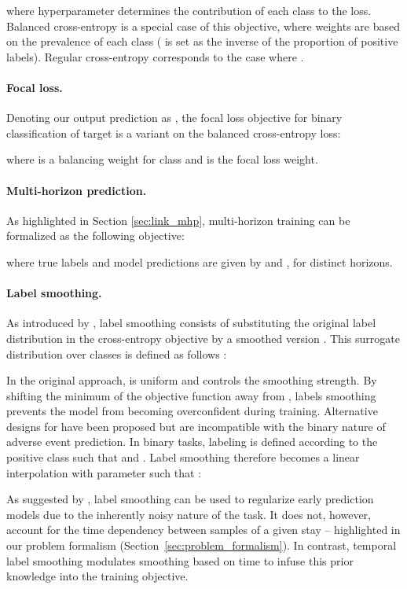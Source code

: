 \documentclass[nohyperref]{article}
\begin{document}
where hyperparameter  determines the contribution of each class to the loss. Balanced cross-entropy is a special case of this objective, where weights are based on the prevalence of each class ( is set as the inverse of the proportion of positive labels). Regular cross-entropy corresponds to the case where .


\paragraph{Focal loss.} Denoting our output prediction as , the focal loss objective for binary classification of target  is a variant on the balanced cross-entropy loss:

where  is a balancing weight for class  and  is the focal loss weight.


\paragraph{Multi-horizon prediction.} As highlighted in Section \ref{sec:link_mhp}, multi-horizon training can be formalized as the following objective:
    
where true labels and model predictions are given by  and , for  distinct horizons.

\paragraph{Label smoothing.} As introduced by \citet{DBLP:conf/cvpr/SzegedyVISW16}, label smoothing consists of substituting the original label distribution  in the cross-entropy objective  by a smoothed version . This surrogate distribution over classes  is defined as follows :

In the original approach,  is uniform and  controls the smoothing strength. By shifting the minimum of the objective function away from , labels smoothing prevents the model from becoming overconfident during training. Alternative designs for  have been proposed \citep{DBLP:conf/aistats/LiDB20,DBLP:conf/acl/MeisterSC20,DBLP:conf/aaai/LienenH21} but are incompatible with the binary nature of adverse event prediction. In binary tasks, labeling is defined according to the positive class such that  and . Label smoothing therefore becomes a linear interpolation with parameter  such that :

As suggested by \citet{DBLP:conf/icml/LukasikBMK20}, label smoothing can be used to regularize early prediction models due to the inherently noisy nature of the task. It does not, however, account for the time dependency between samples of a given stay -- highlighted in our problem formalism (Section~\ref{sec:problem_formalism}). In contrast, temporal label smoothing modulates smoothing based on time  to infuse this prior knowledge into the training objective.
\end{document}
